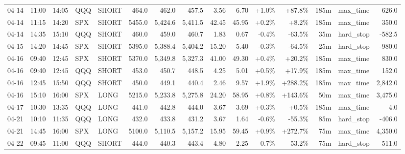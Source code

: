 \documentclass[11pt,a4paper,twoside]{article}
\begin{document}
\begin{landscape}
\begin{center}
\begin{longtable}{>{\color{txtmain}}l l l l l r r r r r r r r >{\color{txtmain}}l r}
04-14 & 11:00 & 14:05 & QQQ & SHORT & 464.0 & 462.0 & 457.5 & 3.56 & 6.70 & \textcolor{wingreen}{+1.0\%} & \textcolor{wingreen}{+87.8\%} & 185m & max\_time & \textcolor{wingreen}{626.0} \\
04-14 & 11:15 & 14:20 & SPX & SHORT & 5455.0 & 5,424.6 & 5,411.5 & 42.45 & 45.95 & \textcolor{wingreen}{+0.2\%} & \textcolor{wingreen}{+8.2\%} & 185m & max\_time & \textcolor{wingreen}{350.0} \\
04-14 & 14:35 & 15:10 & QQQ & SHORT & 460.0 & 459.0 & 460.7 & 1.83 & 0.67 & \textcolor{lossred}{-0.4\%} & \textcolor{lossred}{-63.5\%} & 35m & hard\_stop & \textcolor{lossred}{-582.5} \\
04-15 & 14:20 & 14:45 & SPX & SHORT & 5395.0 & 5,388.4 & 5,404.2 & 15.20 & 5.40 & \textcolor{lossred}{-0.3\%} & \textcolor{lossred}{-64.5\%} & 25m & hard\_stop & \textcolor{lossred}{-980.0} \\
04-16 & 09:40 & 12:45 & SPX & SHORT & 5370.0 & 5,349.8 & 5,327.3 & 41.00 & 49.30 & \textcolor{wingreen}{+0.4\%} & \textcolor{wingreen}{+20.2\%} & 185m & max\_time & \textcolor{wingreen}{830.0} \\
04-16 & 09:40 & 12:45 & QQQ & SHORT & 453.0 & 450.7 & 448.5 & 4.25 & 5.01 & \textcolor{wingreen}{+0.5\%} & \textcolor{wingreen}{+17.9\%} & 185m & max\_time & \textcolor{wingreen}{152.0} \\
04-16 & 12:45 & 15:50 & QQQ & SHORT & 450.0 & 449.1 & 440.4 & 2.46 & 9.57 & \textcolor{wingreen}{+1.9\%} & \textcolor{wingreen}{+288.2\%} & 185m & max\_time & \textcolor{wingreen}{2,842.0} \\
04-16 & 15:10 & 16:00 & SPX & LONG & 5215.0 & 5,233.8 & 5,275.8 & 24.20 & 58.95 & \textcolor{wingreen}{+0.8\%} & \textcolor{wingreen}{+143.6\%} & 50m & max\_time & \textcolor{wingreen}{3,475.0} \\
04-17 & 10:30 & 13:35 & QQQ & LONG & 441.0 & 442.8 & 444.0 & 3.67 & 3.69 & \textcolor{wingreen}{+0.3\%} & \textcolor{wingreen}{+0.5\%} & 185m & max\_time & \textcolor{wingreen}{4.0} \\
04-21 & 10:10 & 11:35 & QQQ & LONG & 432.0 & 433.8 & 431.2 & 3.67 & 1.64 & \textcolor{lossred}{-0.6\%} & \textcolor{lossred}{-55.3\%} & 85m & hard\_stop & \textcolor{lossred}{-406.0} \\
04-21 & 14:45 & 16:00 & SPX & LONG & 5100.0 & 5,110.5 & 5,157.2 & 15.95 & 59.45 & \textcolor{wingreen}{+0.9\%} & \textcolor{wingreen}{+272.7\%} & 75m & max\_time & \textcolor{wingreen}{4,350.0} \\
04-22 & 09:45 & 11:00 & QQQ & SHORT & 444.0 & 440.3 & 443.4 & 4.80 & 2.25 & \textcolor{lossred}{-0.7\%} & \textcolor{lossred}{-53.2\%} & 75m & hard\_stop & \textcolor{lossred}{-511.0} \\

\end{longtable}
\end{center}
\end{landscape}
\end{document}
